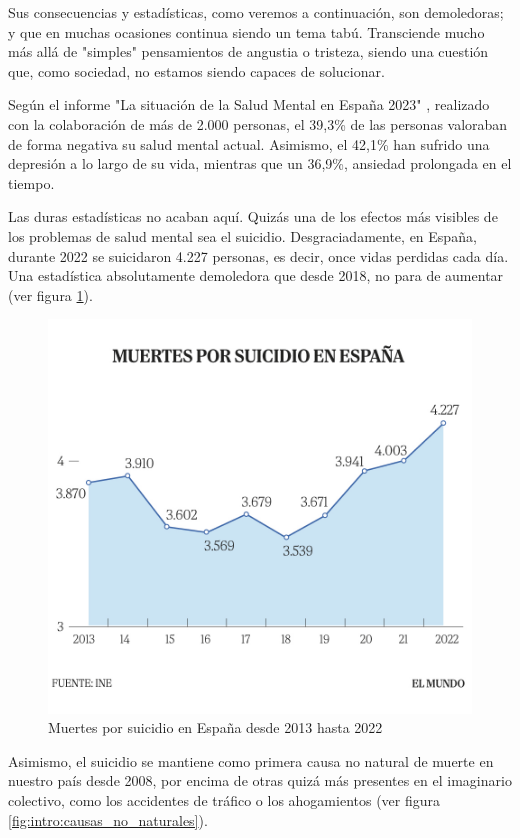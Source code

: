 Sus consecuencias y estadísticas, como veremos a continuación, son demoledoras; y que en muchas ocasiones continua siendo un tema tabú. Transciende mucho más allá de "simples" pensamientos de angustia o tristeza, siendo una cuestión que, como sociedad, no estamos siendo capaces de solucionar.

Según el informe "La situación de la Salud Mental en España 2023" \cite{comunicacion_cuatro_2023}, realizado con la colaboración de más de 2.000 personas, el 39,3\% de las personas valoraban de forma negativa su salud mental actual. Asimismo, el 42,1\% han sufrido una depresión a lo largo de su vida, mientras que un 36,9\%, ansiedad prolongada en el tiempo. 

Las duras estadísticas no acaban aquí. Quizás una de los efectos más visibles de los problemas de salud mental sea el suicidio. Desgraciadamente, en España, durante 2022 se suicidaron 4.227 personas, es decir, once vidas perdidas cada día. Una estadística absolutamente demoledora que desde 2018, no para de aumentar (ver figura \ref{fig:intro:muertes_suicidio}).

\begin{figure}[h]
    \centering
    \includegraphics[width=0.66\linewidth]{figures/muertes_suicidio.jpg}
    \caption{Muertes por suicidio en España desde 2013 hasta 2022 \cite{saiz_4227_2023}}
    \label{fig:intro:muertes_suicidio}
\end{figure}

Asimismo, el suicidio se mantiene como primera causa no natural de muerte en nuestro país desde 2008, por encima de otras quizá más presentes en el imaginario colectivo, como los accidentes de tráfico o los ahogamientos (ver figura \ref{fig:intro:causas_no_naturales}).

